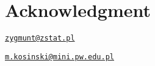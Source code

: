 \section{Acknowledgment}\label{acknowledgment}



\address{%
Zygmunt Zawadzki\\
\\
\\
}
\href{mailto:zygmunt@zstat.pl}{\nolinkurl{zygmunt@zstat.pl}}

\address{%
Marcin Kosiński\\
Warsaw Univeristy of Technology\\
Faculty of Mathematics and Information Science\\ Koszykowa 75, Warsaw Poland\\
}
\href{mailto:m.kosinski@mini.pw.edu.pl}{\nolinkurl{m.kosinski@mini.pw.edu.pl}}

